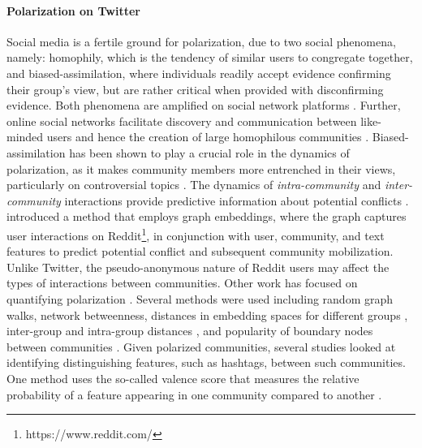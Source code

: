 \documentclass[letterpaper]{article} \usepackage{aaai20}  \usepackage{times}  \usepackage{stackengine}
\begin{document}
\paragraph{Polarization on Twitter} 
\label{sec:quantifyingPolarization}
Social media is a fertile ground for polarization, due to two social phenomena, namely: homophily, which is the tendency of similar users to congregate together, and biased-assimilation, where individuals readily accept evidence confirming their group's view, but are rather critical when provided with disconfirming evidence. Both phenomena are amplified on social network platforms \citep{bias_assim,homophily,homophily_twitter}.
Further, online social networks facilitate discovery and communication between like-minded users and hence the creation of large homophilous communities \citep{homophily_twitter}. Biased-assimilation has been shown to play a crucial role in the dynamics of polarization, as it makes community members more entrenched in their views, particularly on controversial topics \citep{bias_assim}. The dynamics of \textit{intra-community} and \textit{inter-community} interactions provide predictive information about potential conflicts \citep{weber2013secular}. \cite{kumar2018community} introduced a method that employs graph embeddings, where the graph captures user interactions on Reddit\footnote{https://www.reddit.com/}, in conjunction with user, community, and text features to predict potential conflict and subsequent community mobilization. Unlike Twitter, the pseudo-anonymous nature of Reddit users may affect the types of interactions between communities. Other work has focused on quantifying polarization \citep{darwish2019quantifying,garimella2018quantifying,guerra2013measure,morales2015measuring}.  Several methods were used including random graph walks, network betweenness, distances in embedding spaces for different groups \citep{garimella2018quantifying}, inter-group and intra-group distances \citep{morales2015measuring}, and popularity of boundary nodes between communities \citep{guerra2013measure}. Given polarized communities, several studies looked at identifying distinguishing features, such as hashtags, between such communities. One method uses the so-called valence score that measures the relative probability of a feature appearing in one community compared to another \citep{conover2011political,darwish2018scotus,weber2013secular}. 
\end{document}
